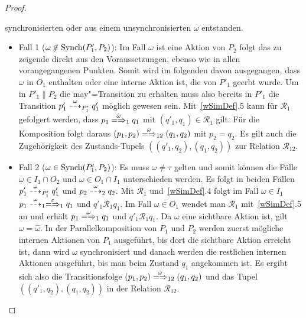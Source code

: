\begin{proof}
\begin{enumerate}
      synchronisierten oder aus einem unsynchronisierten $\omega$ entstanden.
      \begin{itemize}
        \item Fall 1 ($\omega\notin\mathrm{Synch} (P'_1,P_2)$): Im Fall $\omega$ ist
          eine Aktion von $P_2$ folgt das zu zeigende direkt aus den
          Voraussetzungen, ebenso wie in allen vorangegangenen Punkten. Somit
          wird im folgenden davon ausgegangen, dass $\omega$ in $O_1$ enthalten
          oder eine interne Aktion ist, die von $P'_1$ geerbt wurde. Um in
          $P'_1\|P_2$ die may"=Transition zu erhalten muss also bereits in
          $P'_1$ die Transition $p'_1 \may[\omega]_{P'_1} q'_1$ möglich gewesen
          sein. Mit~\ref{wSimDef}.5 kann für $\mathcal{R}_1$ gefolgert werden,
          dass $p_1 \weakmay[\hat{\omega}]_1 q_1$ mit $(q'_1,q_1) \in
          \mathcal{R}_1$ gilt. Für die Komposition folgt daraus $(p_1,p_2)
          \weakmay[\hat{\omega}]_{12} (q_1,q_2)$ mit $p_2=q_2$. Es gilt auch
          die Zugehörigkeit des Zustands-Tupels $((q'_1,q_2),(q_1,q_2))$ zur
          Relation $\mathcal{R}_{12}$.
        \item Fall 2 ($\omega\in\mathrm{Synch} (P'_1,P_2)$): Es muss $\omega\neq\tau$
          gelten und somit können die Fälle $\omega\in I_1\cap O_2$ und
          $\omega\in O_1\cap I_1$ unterschieden werden. Es folgt in beiden
          Fällen $p'_1\may[\omega]_{P'_1} q'_1$ und $p_2 \may[\omega]_2
          q_2$. Mit $\mathcal{R}_1$ und~\ref{wSimDef}.4 folgt im Fall
          $\omega\in I_1$ $p_1\may[\omega]_1 \weakmay[\varepsilon]_1 q_1$ und
          $q'_1 \mathcal{R}_1 q_1$. Im Fall $\omega\in O_1$ wendet man
          $\mathcal{R}_1$ mit~\ref{wSimDef}.5 an und erhält $p_1
          \weakmay[\omega]_1 q_1$ und $q'_1\mathcal{R}_1 q_1$. Da $\omega$
          eine sichtbare Aktion ist, gilt $\omega =\hat{\omega}$. In der
          Parallelkomposition von $P_1$ und $P_2$ werden zuerst mögliche
          internen Aktionen von $P_1$ ausgeführt, bis dort die sichtbare Aktion
          erreicht ist, dann wird $\omega$ synchronisiert und danach werden die
          restlichen internen Aktionen ausgeführt, bis man beim Zustand
          $q_1$ angekommen ist. Es ergibt sich also die Transitionsfolge
          $(p_1,p_2) \weakmay[\hat{\omega}]_{12} (q_1,q_2)$ und das Tupel
          $((q'_1,q_2),(q_1,q_2))$ in der Relation $\mathcal{R}_{12}$.
      \end{itemize}
  \end{enumerate}
\end{proof}

